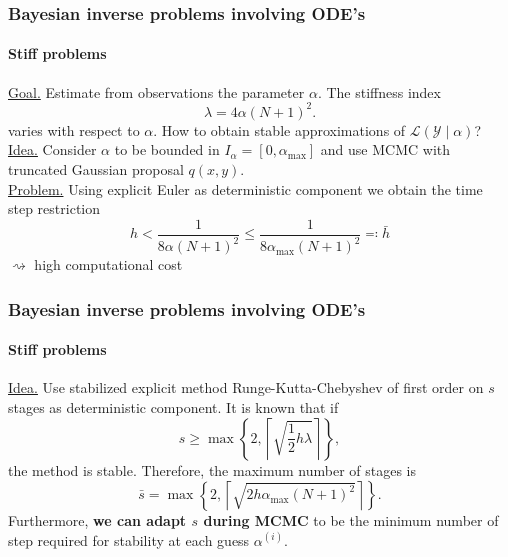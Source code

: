 \documentclass{beamer}
\newcommand{\diffL}{\mathcal{L}}
\newcommand{\eqdef}{\eqqcolon}
\begin{document}
\begin{frame}
	\frametitle{Bayesian inverse problems involving ODE's}
	\framesubtitle{Stiff problems}
	
	\underline{Goal.} Estimate from observations the parameter $\alpha$. The stiffness index
	\begin{equation*}
		\lambda = 4 \alpha (N+1)^2.
	\end{equation*}
	varies with respect to $\alpha$. How to obtain stable approximations of $\diffL(\mathcal{Y}\mid\alpha)$? \\[0.5cm]
	
	\underline{Idea.} Consider $\alpha$ to be bounded in $I_\alpha = [0, \alpha_{\max}]$ and use MCMC with truncated Gaussian proposal $q(x,y)$. \\[0.5cm]
	
	\underline{Problem.} Using explicit Euler as deterministic component we obtain the time step restriction
	\begin{equation*}
		h < \frac{1}{8\alpha(N+1)^2} \leq \frac{1}{8\alpha_{\max}(N+1)^2} \eqdef \bar h 
	\end{equation*} 
	$\rightsquigarrow$ high computational cost
\end{frame}

\begin{frame}
	\frametitle{Bayesian inverse problems involving ODE's}
	\framesubtitle{Stiff problems}
	
	\underline{Idea.} Use stabilized explicit method Runge-Kutta-Chebyshev of first order on $s$ stages as deterministic component. It is known that if 
	\begin{equation*}
		s \geq \max\left\{2, \left\lceil\sqrt{\frac{1}{2}h\lambda}\right\rceil \right\},
	\end{equation*}
	the method is stable. Therefore, the maximum number of stages is
	\begin{equation*}
		\bar s = \max\left\{2, \left\lceil \sqrt{2h\alpha_{\max}(N+1)^2} \right\rceil\right\}.
	\end{equation*}
	Furthermore, \textbf{we can adapt $s$ during MCMC} to be the minimum number of step required for stability at each guess $\alpha^{(i)}$.
\end{frame}
\end{document}
